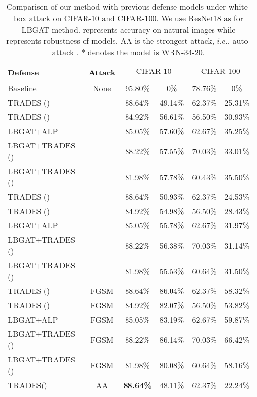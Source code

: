 \documentclass[final]{cvpr}
\begin{document}
\begin{table*}[t!]
	\centering
	\caption{Comparison of our method with previous defense models under white-box attack on CIFAR-10 and CIFAR-100. We use ResNet18 as  for LBGAT method.  represents accuracy on natural images while  represents robustness of models. AA is the strongest attack, {\it i.e.}, auto-attack \cite{croce2020reliable}. * denotes the model is WRN-34-20.
	}
	\begin{tabular}{l|c|c | c | c |c }
		\hline
		\hline
		\multirow{2}{*}{\textbf{Defense}} & \multirow{2}{*}{\textbf{Attack}} & \multicolumn{2}{c|}{CIFAR-10} & \multicolumn{2}{c}{CIFAR-100} \\
		\cline{3-6}
		& & & & & \\
		\hline
		Baseline                      & None  &95.80\% &0\% &78.76\% &0\% \\       
		\hline
		TRADES ()           & &88.64\% & 49.14\% &62.37\% &25.31\% \\
		TRADES ()           & &84.92\% & 56.61\% &56.50\% &30.93\% \\
		LBGAT+ALP                     & &85.05\% &57.60\% &62.67\% &35.25\% \\
		LBGAT+TRADES ()     & &88.22\% &57.55\% &70.03\% &33.01\%  \\
		LBGAT+TRADES ()     & &81.98\% &57.78\% &60.43\% &35.50\%  \\
		\hline
		TRADES ()  &  &88.64\%  &50.93\% &62.37\% &24.53\% \\
		TRADES ()  &  &84.92\%  &54.98\% &56.50\% &28.43\% \\
		LBGAT+ALP                    &    &85.05\% &55.78\% &62.67\% &31.97\% \\
		LBGAT+TRADES ()    &    &88.22\% &56.38\% &70.03\% &31.14\% \\
		LBGAT+TRADES ()    &    &81.98\% &55.53\% &60.64\% &31.50\% \\
		\hline
		TRADES ()          &FGSM  &88.64\% &86.04\% &62.37\% &58.32\%  \\
		TRADES ()          &FGSM  &84.92\% &82.07\% &56.50\% &53.82\%  \\
		LBGAT+ALP                    &FGSM  &85.05\% &83.19\% &62.67\% &59.87\%  \\
		LBGAT+TRADES ()    &FGSM  &88.22\% &86.14\% &70.03\% &66.42\%  \\
		LBGAT+TRADES ()    &FGSM  &81.98\% &80.08\% &60.64\% &58.16\%  \\
		\hline
		TRADES()                       &AA &\textbf{88.64\%} &48.11\% &62.37\% &22.24\% \\

\end{tabular}
\end{table*}
\end{document}
